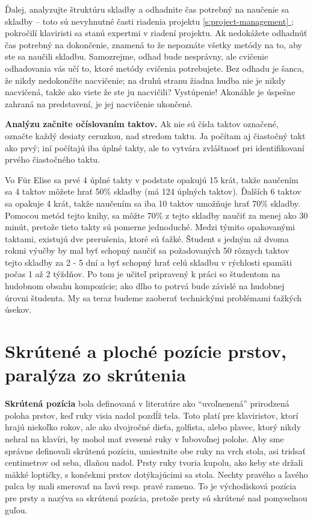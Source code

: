 \documentclass[11pt,a4paper]{book}
\newcommand*{\fullref}[1]{\hyperref[{#1}]{\ref*{#1} \nameref*{#1}}} %
\begin{document}
Ďalej, analyzujte štruktúru skladby a odhadnite čas potrebný na naučenie sa skladby -- toto sú nevyhnutné časti riadenia projektu \fullref{s:project-management}; pokročilí klaviristi sa stanú expertmi v riadení projektu. Ak nedokážete odhadnúť čas potrebný na dokončenie, znamená to že nepoznáte všetky metódy na to, aby ste sa naučili skladbu. Samozrejme, odhad bude nesprávny, ale cvičenie odhadovania vás učí to, ktoré metódy cvičenia potrebujete. Bez odhadu je šanca, že nikdy nedokončíte nacvičenie; na druhú stranu žiadna hudba nie je nikdy nacvičená, takže ako viete že ste ju nacvičili? Vystúpenie! Akonáhle je úspešne zahraná na predstavení, je jej nacvičenie ukončené.

\textbf{Analýzu začnite očíslovaním taktov.} Ak nie sú čísla taktov označené, označte každý desiaty ceruzkou, nad stredom taktu. Ja počítam aj čiastočný takt ako prvý; iní počítajú iba úplné takty, ale to vytvára zvláštnosť pri identifikovaní prvého čiastočného taktu. 

Vo Für Elise sa prvé 4 úplné takty v podstate opakujú 15 krát, takže naučením sa 4 taktov môžete hrať 50\% skladby (má 124 úplných taktov). Ďalších 6 taktov sa opakuje 4 krát, takže naučením sa iba 10 taktov umožňuje hrať 70\% skladby. Pomocou metód tejto knihy, sa môžte 70\% z tejto skladby naučiť za menej ako 30 minút, pretože tieto takty sú pomerne jednoduché. Medzi týmito opakovanými taktami, existujú dve prerušenia, ktoré sú ťažké. Študent s jedným až dvoma rokmi výučby by mal byť schopný naučiť sa požadovaných 50 rôznych taktov tejto skladby za 2 - 5 dní a byť schopný hrať celú skladbu v rýchlosti spamäti počas 1 až 2 týždňov. Po tom je učiteľ pripravený k práci so študentom na hudobnom obsahu kompozície; ako dlho to potrvá bude závislé na hudobnej úrovni študenta. My sa teraz budeme zaoberať technickými problémami ťažkých úsekov.

\section{Skrútené a ploché pozície prstov, paralýza zo skrútenia}\label{s:curled-positions}
\textbf{Skrútená pozícia} bola definovaná v literatúre ako “uvoľnenená” prirodzená poloha prstov, keď ruky visia nadol pozdĺž tela. Toto platí pre klaviristov, ktorí hrajú niekoľko rokov, ale ako dvojročné dieťa, golfista, alebo plavec, ktorý nikdy nehral na klavíri, by mohol mať zvesené ruky v ľubovoľnej polohe. Aby sme správne definovali skrútenú pozíciu, umiestnite obe ruky na vrch stola, asi tridsať centimetrov od seba, dlaňou nadol. Prsty ruky tvoria kupolu, ako keby ste držali mäkké loptičky, s končekmi prstov dotýkajúcimi sa stola. Nechty pravého a ľavého palca by mali smerovať na ľavú resp. pravé rameno. To je východisková pozícia pre prsty a nazýva sa skrútená pozícia, pretože prsty sú skrútené nad pomyselnou guľou.
\end{document}
